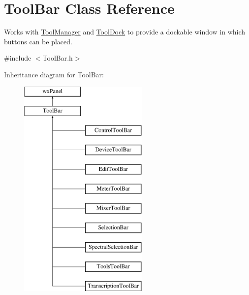 \hypertarget{class_tool_bar}{}\section{Tool\+Bar Class Reference}
\label{class_tool_bar}


Works with \hyperlink{class_tool_manager}{Tool\+Manager} and \hyperlink{class_tool_dock}{Tool\+Dock} to provide a dockable window in which buttons can be placed.  




{\ttfamily \#include $<$Tool\+Bar.\+h$>$}

Inheritance diagram for Tool\+Bar\+:\begin{figure}[H]
\begin{center}
\leavevmode
\includegraphics[height=11.000000cm]{class_tool_bar}
\end{center}
\end{figure}
